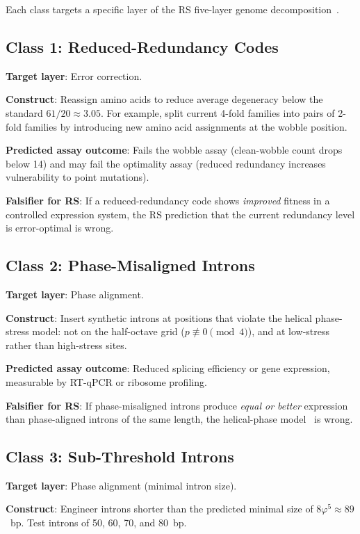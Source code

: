 \documentclass[11pt,twocolumn]{article}
\begin{document}
Each class targets a specific layer of the RS five-layer genome
decomposition~\cite{Paper4}.

\subsection{Class 1: Reduced-Redundancy Codes}

\textbf{Target layer}: Error correction.

\textbf{Construct}: Reassign amino acids to reduce average degeneracy
below the standard $61/20 \approx 3.05$. For example, split current
4-fold families into pairs of 2-fold families by introducing new amino
acid assignments at the wobble position.

\textbf{Predicted assay outcome}: Fails the wobble assay (clean-wobble
count drops below 14) and may fail the optimality assay (reduced
redundancy increases vulnerability to point mutations).

\textbf{Falsifier for RS}: If a reduced-redundancy code shows
\emph{improved} fitness in a controlled expression system, the RS
prediction that the current redundancy level is error-optimal is wrong.

\subsection{Class 2: Phase-Misaligned Introns}

\textbf{Target layer}: Phase alignment.

\textbf{Construct}: Insert synthetic introns at positions that violate
the helical phase-stress model: not on the half-octave grid
($p \not\equiv 0 \pmod{4}$), and at low-stress rather than high-stress
sites.

\textbf{Predicted assay outcome}: Reduced splicing efficiency or gene
expression, measurable by RT-qPCR or ribosome profiling.

\textbf{Falsifier for RS}: If phase-misaligned introns produce
\emph{equal or better} expression than phase-aligned introns of the same
length, the helical-phase model~\cite{Paper7} is wrong.

\subsection{Class 3: Sub-Threshold Introns}

\textbf{Target layer}: Phase alignment (minimal intron size).

\textbf{Construct}: Engineer introns shorter than the predicted minimal
size of $8\varphi^5 \approx 89$~bp. Test introns of 50, 60, 70, and
80~bp.
\end{document}
